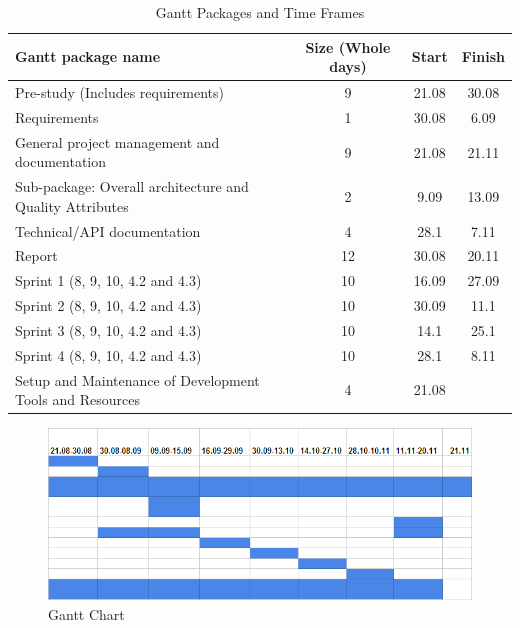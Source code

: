 \hspace{-5cm}
\begin{table}[H]
\centering
\begin{tabular}{|p{6cm}|c|c|c|}
\hline
\textbf{Gantt package name} & \textbf{Size (Whole days)} & \textbf{Start} & \textbf{Finish}\\ 
\hline
Pre-study (Includes requirements) & 9 & 21.08 & 30.08\\ 
\hline
Requirements & 1 & 30.08 & 6.09\\ 
\hline
General project management and documentation & 9 & 21.08 & 21.11\\ 
\hline
Sub-package: Overall architecture and Quality Attributes & 2 & 9.09 & 13.09\\ 
\hline
Technical/API documentation & 4 & 28.1 & 7.11\\ 
\hline
Report & 12 & 30.08 & 20.11\\ 
\hline
Sprint 1 (8, 9, 10, 4.2 and 4.3) & 10 & 16.09 & 27.09\\ 
\hline
Sprint 2 (8, 9, 10, 4.2 and 4.3) & 10 & 30.09 & 11.1\\ 
\hline
Sprint 3 (8, 9, 10, 4.2 and 4.3) & 10 & 14.1 & 25.1\\ 
\hline
Sprint 4 (8, 9, 10, 4.2 and 4.3) & 10 & 28.1 & 8.11\\ 
\hline
Setup and Maintenance of Development Tools and Resources & 4 & 21.08 & \\ 
\hline
\end{tabular}
\label{GanttPackages}
\caption{\small{Gantt Packages and Time Frames}} 
\end{table}

\begin{figure}[H]
\includegraphics[width=1\textwidth]{images/gantt02.png}
\caption{Gantt Chart}
\end{figure}
